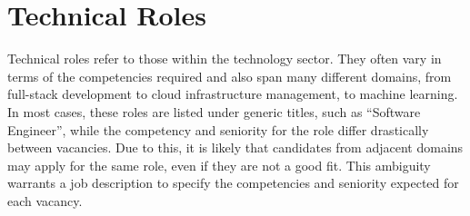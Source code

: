 \section{Technical Roles}

Technical roles refer to those within the technology sector. They often vary in terms of the competencies required and
also span many different domains, from full-stack development to cloud infrastructure management, to machine learning.
In most cases, these roles are listed under generic titles, such as ``Software Engineer'', while the competency and seniority
for the role differ drastically between vacancies. Due to this, it is likely that candidates from adjacent domains may
apply for the same role, even if they are not a good fit. This ambiguity warrants a job description to specify the
competencies and seniority expected for each vacancy.
